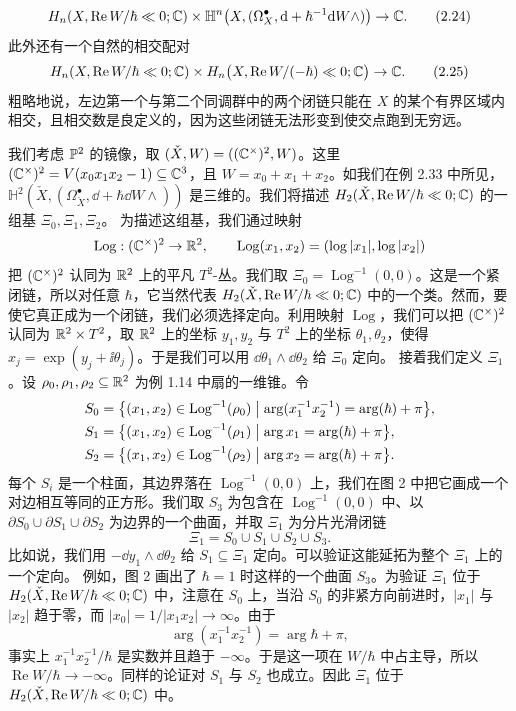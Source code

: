 \begin{equation}
H_n(X,\operatorname{Re}W/\hbar\ll0;\mathbb{C})\times\mathbb{H}^n\bigl(X,(\Omega^\bullet_X,\mathrm{d}+\hbar^{-1}\mathrm{d} W\wedge)\bigr)\to\mathbb{C}. \tag{2.24}
\end{equation}
此外还有一个自然的相交配对
\begin{equation}
H_n(X,\operatorname{Re}W/\hbar\ll0;\mathbb{C})\times H_n\bigl(X,\operatorname{Re}W/(-\hbar)\ll0;\mathbb{C}\bigr)\to\mathbb{C}. \tag{2.25}
\end{equation}
粗略地说，左边第一个与第二个同调群中的两个闭链只能在 $X$ 的某个有界区域内相交，且相交数是良定义的，因为这些闭链无法形变到使交点跑到无穷远。

\begin{example}
我们考虑 $\mathbb{P}^2$ 的镜像，取 $(\check X,W)=((\mathbb{C}^\times)^2,W)$。这里 $(\mathbb{C}^\times)^2=V(x_0x_1x_2-1)\subseteq\mathbb{C}^3$，且 $W=x_0+x_1+x_2$。如我们在例 2.33 中所见，$\mathbb{H}^2(\check X,(\Omega^\bullet_{\check X},\dd+\hbar\dd W\wedge))$ 是三维的。我们将描述 $H_2(\check X,\operatorname{Re}W/\hbar\ll0;\mathbb{C})$ 的一组基 $\Xi_0,\Xi_1,\Xi_2$。
为描述这组基，我们通过映射
\[
\operatorname{Log}:(\mathbb{C}^\times)^2\to\mathbb{R}^2,\qquad \operatorname{Log}(x_1,x_2)=(\log|x_1|,\log|x_2|)
\]
把 $(\mathbb{C}^\times)^2$ 认同为 $\mathbb{R}^2$ 上的平凡 $T^2$-丛。我们取 $\Xi_0=\operatorname{Log}^{-1}(0,0)$。这是一个紧闭链，所以对任意 $\hbar$，它当然代表 $H_2(\check X,\operatorname{Re}W/\hbar\ll0;\mathbb{C})$ 中的一个类。然而，要使它真正成为一个闭链，我们必须选择定向。利用映射 $\operatorname{Log}$，我们可以把 $(\mathbb{C}^\times)^2$ 认同为 $\mathbb{R}^2\times T^2$，取 $\mathbb{R}^2$ 上的坐标 $y_1,y_2$ 与 $T^2$ 上的坐标 $\theta_1,\theta_2$，使得 $x_j=\exp(y_j+\ii\theta_j)$。于是我们可以用 $\dd\theta_1\wedge\dd\theta_2$ 给 $\Xi_0$ 定向。
接着我们定义 $\Xi_1$。设 $\rho_0,\rho_1,\rho_2\subseteq\mathbb{R}^2$ 为例 1.14 中扇的一维锥。令
\begin{align*}
S_0&=\bigl\{(x_1,x_2)\in\operatorname{Log}^{-1}(\rho_0)\bigm|\arg(x_1^{-1}x_2^{-1})=\arg(\hbar)+\pi\bigr\},\\
S_1&=\bigl\{(x_1,x_2)\in\operatorname{Log}^{-1}(\rho_1)\bigm|\arg x_1=\arg(\hbar)+\pi\bigr\},\\
S_2&=\bigl\{(x_1,x_2)\in\operatorname{Log}^{-1}(\rho_2)\bigm|\arg x_2=\arg(\hbar)+\pi\bigr\}.
\end{align*}
每个 $S_i$ 是一个柱面，其边界落在 $\operatorname{Log}^{-1}(0,0)$ 上，我们在图 2 中把它画成一个对边相互等同的正方形。我们取 $S_3$ 为包含在 $\operatorname{Log}^{-1}(0,0)$ 中、以 $\partial S_0\cup\partial S_1\cup\partial S_2$ 为边界的一个曲面，并取 $\Xi_1$ 为分片光滑闭链
\[
\Xi_1=S_0\cup S_1\cup S_2\cup S_3.
\]
比如说，我们用 $-\dd y_1\wedge\dd\theta_2$ 给 $S_1\subseteq\Xi_1$ 定向。可以验证这能延拓为整个 $\Xi_1$ 上的一个定向。
例如，图 2 画出了 $\hbar=1$ 时这样的一个曲面 $S_3$。为验证 $\Xi_1$ 位于 $H_2(\check X,\operatorname{Re}W/\hbar\ll0;\mathbb{C})$ 中，注意在 $S_0$ 上，当沿 $S_0$ 的非紧方向前进时，$|x_1|$ 与 $|x_2|$ 趋于零，而 $|x_0|=1/|x_1x_2|\to\infty$。由于
\[
\arg(x_1^{-1}x_2^{-1})=\arg\hbar+\pi,
\]
事实上 $x_1^{-1}x_2^{-1}/\hbar$ 是实数并且趋于 $-\infty$。于是这一项在 $W/\hbar$ 中占主导，所以 $\operatorname{Re}W/\hbar\to-\infty$。同样的论证对 $S_1$ 与 $S_2$ 也成立。因此 $\Xi_1$ 位于 $H_2(\check X,\operatorname{Re}W/\hbar\ll0;\mathbb{C})$ 中。


\end{example}
